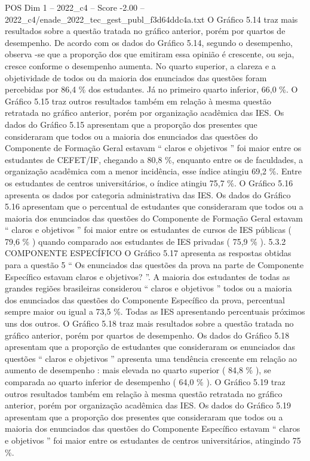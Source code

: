 \begin{textsample}{POS Dim 1 – 2022\_c4 – Score -2.00 – 2022\_c4/enade\_2022\_tec\_gest\_publ\_f3d64ddc4a.txt}
O Gráfico 5.14 traz mais resultados sobre a questão tratada no gráfico anterior, porém por quartos de desempenho.
De acordo com os dados do Gráfico 5.14, segundo o desempenho, observa -se que a proporção dos que emitiram essa opinião é crescente, ou seja, cresce conforme o desempenho aumenta.
No quarto superior, a clareza e a objetividade de todos ou da maioria dos enunciados das questões foram percebidas por 86,4 \% dos estudantes.
Já no primeiro quarto inferior, 66,0 \%.
O Gráfico 5.15 traz outros resultados também em relação à mesma questão retratada no gráfico anterior, porém por organização acadêmica das IES.
Os dados do Gráfico 5.15 apresentam que a proporção dos presentes que consideraram que todos ou a maioria dos enunciados das questões do Componente de Formação Geral estavam “ claros e objetivos ” foi maior entre os estudantes de CEFET/IF, chegando a 80,8 \%, enquanto entre os de faculdades, a organização acadêmica com a menor incidência, esse índice atingiu 69,2 \%.
Entre os estudantes de centros universitários, o índice atingiu 75,7 \%.
O Gráfico 5.16 apresenta os dados por categoria administrativa das IES.
Os dados do Gráfico 5.16 apresentam que o percentual de estudantes que consideraram que todos ou a maioria dos enunciados das questões do Componente de Formação Geral estavam “ claros e objetivos ” foi maior entre os estudantes de cursos de IES públicas ( 79,6 \% ) quando comparado aos estudantes de IES privadas ( 75,9 \% ). 5.3.2 COMPONENTE ESPECÍFICO O Gráfico 5.17 apresenta as respostas obtidas para a questão 5 “ Os enunciados das questões da prova na parte de Componente Específico estavam claros e objetivos? ”.
A maioria dos estudantes de todas as grandes regiões brasileiras considerou “ claros e objetivos ” todos ou a maioria dos enunciados das questões do Componente Específico da prova, percentual sempre maior ou igual a 73,5 \%.
Todas as IES apresentando percentuais próximos uns dos outros.
O Gráfico 5.18 traz mais resultados sobre a questão tratada no gráfico anterior, porém por quartos de desempenho.
Os dados do Gráfico 5.18 apresentam que a proporção de estudantes que consideraram os enunciados das questões “ claros e objetivos ” apresenta uma tendência crescente em relação ao aumento de desempenho : mais elevada no quarto superior ( 84,8 \% ), se comparada ao quarto inferior de desempenho ( 64,0 \% ).
O Gráfico 5.19 traz outros resultados também em relação à mesma questão retratada no gráfico anterior, porém por organização acadêmica das IES.
Os dados do Gráfico 5.19 apresentam que a proporção dos presentes que consideraram que todos ou a maioria dos enunciados das questões do Componente Específico estavam “ claros e objetivos ” foi maior entre os estudantes de centros universitários, atingindo 75 \%.

\end{textsample}
